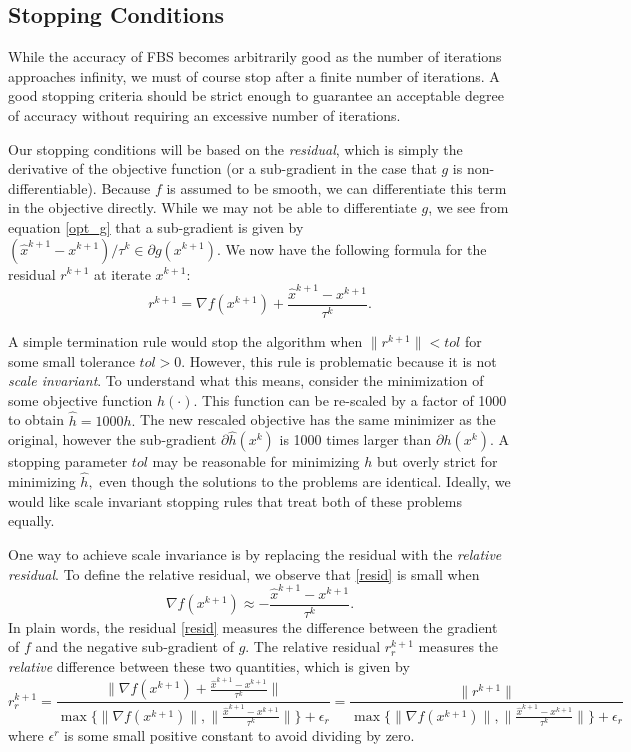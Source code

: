 \documentclass{amsart}
\newcommand{\eqn}[2]{\begin{equation}\label{#1}#2\end{equation}}
\newcommand{\kp}{^{k+1}}
\theoremstyle{definition}
\begin{document}
\subsection{Stopping Conditions}\label{sec:stop}
While the accuracy of FBS becomes arbitrarily good as the number of iterations approaches infinity, we must of course stop after a finite number of iterations.  A good stopping criteria should be strict enough to guarantee an acceptable degree of accuracy without requiring an excessive number of iterations.  

Our stopping conditions will be based on the {\em residual}, which is simply the derivative of the objective function (or a sub-gradient in the case that $g$ is non-differentiable).  Because $f$ is assumed to be smooth, we can differentiate this term in the objective directly.  While we may not be able to differentiate $g$, we see from equation \eqref{opt_g} that a sub-gradient is given by $(\hat x^{k+1}-x\kp)/\tau^k \in \partial g(x\kp).$  We now have the following formula for the residual $r\kp$ at iterate $x\kp:$
  \eqn{resid}{r\kp = \nabla f(x\kp)+\frac{ \hat x^{k+1}-x\kp}{\tau^k}.}

A simple termination rule would stop the algorithm when $\|r\kp\|<tol$ for some small tolerance $tol>0$.  However, this rule is problematic because it is not {\em scale invariant}.   To understand what this means, consider the minimization of some objective function $h(\cdot).$  This function can be re-scaled by a factor of 1000 to obtain $\hat h = 1000h.$  The new rescaled objective has the same minimizer as the original, however the sub-gradient $\partial \hat h(x^k)$ is 1000 times larger than $\partial  h(x^k).$  A stopping parameter $tol$ may be reasonable for minimizing $h$ but overly strict for minimizing $\hat h,$ even though the solutions to the problems are identical.   Ideally, we would like scale invariant stopping rules that treat both of these problems equally.

One way to achieve scale invariance is by replacing the residual with the {\em relative residual}. To define the relative residual, we observe that \eqref{resid} is small when
  \eqn{relmatch}{ \nabla f(x\kp)\approx - \frac{ \hat x^{k+1}-x\kp}{\tau^k}.}
In plain words, the residual \eqref{resid} measures the difference between the gradient of $f$ and the negative sub-gradient of $g$. The relative residual $r\kp_r$ measures the {\em relative} difference between these two quantities, which is given by
\eqn{rr}{ r\kp_r =  \frac{ \| \nabla f(x\kp)+\frac{ \hat x^{k+1}-x\kp}{\tau^k}   \| }{ \max\{
\|\nabla f(x\kp)\|,
\|\frac{ \hat x^{k+1}-x\kp}{\tau^k}\|
 \}+\epsilon_r}
 =  \frac{ \| r\kp\|   }{ \max\{
\|\nabla f(x\kp)\|,
\|\frac{ \hat x^{k+1}-x\kp}{\tau^k}
 \|\}+\epsilon_r}   }
where $\epsilon^r$ is some small positive constant to avoid dividing by zero.
\end{document}
